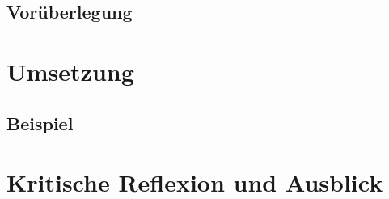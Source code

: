 \documentclass[12pt]{report}
\begin{document}
\section{Vorüberlegung}
\blindtext


\newpage
\chapter{Umsetzung}
\blindtext


\pagebreak
\section{Beispiel}
\blindtext


\newpage
\chapter{Kritische Reflexion und Ausblick}
\blindtext


\newpage
{}
\setcounter{page}{\value{frontmatterPage}} %
\addtocounter{page}{1}

\renewcommand{\refname}{Literaturverzeichnis}


\end{document}
